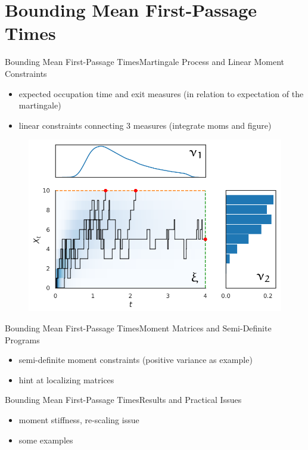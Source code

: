 \documentclass{beamer}
\begin{document}
\section{Bounding Mean First-Passage Times}
\begin{frame}{Bounding Mean First-Passage Times}{Martingale Process and Linear Moment Constraints}
  \begin{itemize}
      \item expected occupation time and exit measures (in relation to expectation of the martingale)
      \item linear constraints connecting 3 measures (integrate moms and figure)
  \end{itemize}
    \begin{figure}
        \centering
        \includegraphics[scale=.4]{../gfx/decomp1.pdf}
    \end{figure}
\end{frame}

\begin{frame}{Bounding Mean First-Passage Times}{Moment Matrices and Semi-Definite Programs}
  \begin{itemize}
    \item semi-definite moment constraints (positive variance as example)
    \item hint at localizing matrices
  \end{itemize}
\end{frame}

\begin{frame}{Bounding Mean First-Passage Times}{Results and Practical Issues}
  \begin{itemize}
    \item moment stiffness, re-scaling issue
    \item some examples
  \end{itemize}
\end{frame}
\end{document}
